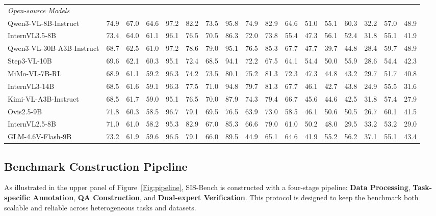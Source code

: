 \documentclass[sigconf, screen, review, anonymous]{acmart}
\begin{document}
\begin{table}[t]
{\begin{tabular}{l|ccc|ccc|ccc|cc|c|cc|cc}
\hline
\multicolumn{17}{l}{\cellcolor[HTML]{ECF4FF}\textit{Open-source Models}} \\
Qwen3-VL-8B-Instruct & 74.9 & 67.0 & 64.6 & 97.2 & 82.2 & 73.5 & 95.8 & 74.9 & 82.9 & 64.6 & 51.0 & 55.1 & 60.3 & 32.2 & 57.0 & 48.9 \\
InternVL3.5-8B & 73.4 & 64.0 & 61.1 & 96.1 & 76.5 & 70.5 & 86.3 & 72.0 & 73.8 & 55.4 & 47.3 & 56.1 & 52.4 & 31.8 & 55.1 & 41.9 \\
Qwen3-VL-30B-A3B-Instruct & 68.7 & 62.5 & 61.0 & 97.2 & 78.6 & 79.0 & 95.1 & 76.5 & 85.3 & 67.7 & 47.7 & 39.7 & 44.8 & 28.4 & 59.7 & 48.9 \\
Step3-VL-10B & 69.6 & 62.1 & 60.3 & 95.1 & 72.4 & 68.5 & 94.1 & 72.2 & 67.5 & 64.1 & 54.4 & 50.0 & 55.9 & 28.6 & 54.4 & 42.3 \\
MiMo-VL-7B-RL & 68.9 & 61.1 & 59.2 & 96.3 & 74.2 & 73.5 & 80.1 & 75.2 & 81.3 & 72.3 & 47.3 & 44.8 & 43.2 & 29.7 & 51.7 & 40.8 \\
InternVL3-14B & 68.5 & 61.6 & 59.1 & 96.3 & 77.5 & 71.0 & 94.8 & 79.7 & 81.3 & 67.7 & 46.1 & 42.7 & 43.8 & 24.9 & 55.5 & 31.6 \\
Kimi-VL-A3B-Instruct & 68.5 & 61.7 & 59.0 & 95.1 & 76.5 & 70.0 & 87.9 & 74.3 & 79.4 & 66.7 & 45.6 & 44.6 & 42.5 & 31.8 & 57.4 & 27.9 \\
Ovis2.5-9B & 71.8 & 60.3 & 58.5 & 96.7 & 79.1 & 69.5 & 76.5 & 63.9 & 73.0 & 58.5 & 46.1 & 50.6 & 50.5 & 26.7 & 60.1 & 41.5 \\
InternVL2.5-8B & 71.0 & 61.0 & 58.2 & 95.3 & 82.9 & 67.0 & 85.3 & 66.6 & 79.0 & 61.0 & 50.2 & 48.0 & 29.5 & 33.2 & 53.2 & 29.0 \\
GLM-4.6V-Flash-9B & 73.2 & 61.9 & 59.6 & 96.5 & 79.1 & 66.0 & 89.5 & 44.9 & 65.1 & 64.6 & 41.9 & 55.2 & 56.2 & 37.1 & 55.1 & 43.4 \\

\hline
\end{tabular}
}
\end{table}





\subsection{Benchmark Construction Pipeline}
\label{sec:pipeline}

As illustrated in the upper panel of Figure~\ref{Fig:pipeline}, SIS-Bench is constructed with a four-stage pipeline: \textbf{Data Processing}, \textbf{Task-specific Annotation}, \textbf{QA Construction}, and \textbf{Dual-expert Verification}. This protocol is designed to keep the benchmark both scalable and reliable across heterogeneous tasks and datasets.
\end{document}
